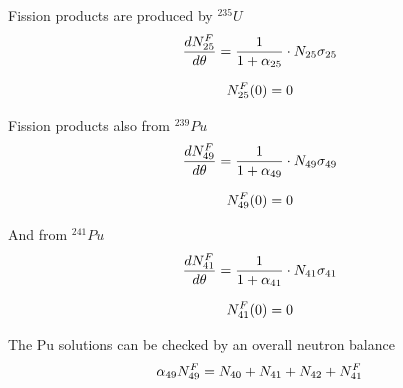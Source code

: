 \documentclass[aspectratio=1610,pdftex,dvipsnames,compress,xcolor={dvipsnames}]{beamer}
\begin{document}
\begin{frame}{Fission products are produced by $^{235}U$}
    \begin{equation}
        \LARGE
        \frac{dN_{25}^F}{d\theta}=\frac{1}{1 + \alpha_{25}}\cdot N_{25}\sigma_{25}
    \end{equation}
    
    \begin{equation}
        \LARGE
        N_{25}^F(0)=0
    \end{equation}
\end{frame}


\begin{frame}{Fission products also from $^{239}Pu$}
    \begin{equation}
        \LARGE
        \frac{dN_{49}^F}{d\theta}=\frac{1}{1 + \alpha_{49}}\cdot N_{49}\sigma_{49}
    \end{equation}
    
    \begin{equation}
        \LARGE
        N_{49}^F(0)=0
    \end{equation}
\end{frame}


\begin{frame}{And from $^{241}Pu$}
    \begin{equation}
        \LARGE
        \frac{dN_{41}^F}{d\theta}=\frac{1}{1 + \alpha_{41}}\cdot N_{41}\sigma_{41}
    \end{equation}
    
    \begin{equation}
        \LARGE
        N_{41}^F(0)=0
    \end{equation}
\end{frame}


\begin{frame}{The Pu solutions can be checked by an overall neutron balance}
    \begin{equation}
        \LARGE
        \alpha_{49} N_{49}^F=N_{40} + N_{41} + N_{42} + N_{41}^F
    \end{equation}
\end{frame}
\end{document}
